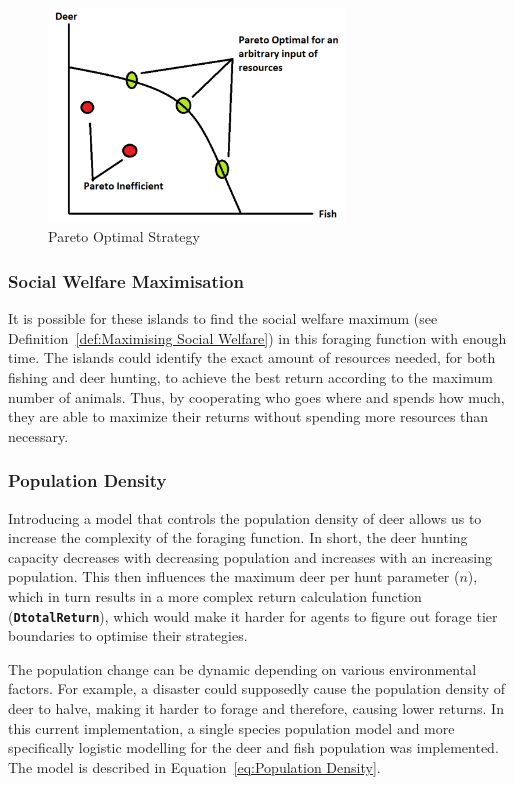 \begin{figure}[!htb]
    \centering
    \includegraphics[width=0.7\textwidth]{04_environment/images/Pareto Optimal Strategy.PNG}
    \caption{Pareto Optimal Strategy}
    \label{fig:Pareto Optimal Strategy}
\end{figure}

\subsubsection{Social Welfare Maximisation}

It is possible for these islands to find the social welfare maximum (see Definition~\ref{def:Maximising Social Welfare}) in this foraging function with enough time. The islands could identify the exact amount of resources needed, for both fishing and deer hunting, to achieve the best return according to the maximum number of animals. Thus, by cooperating who goes where and spends how much, they are able to maximize their returns without spending more resources than necessary.

\subsubsection{Population Density}

Introducing a model that controls the population density of deer allows us to increase the complexity of the foraging function. In short, the deer hunting capacity decreases with decreasing population and increases with an increasing population. This then influences the maximum deer per hunt parameter ($n$), which in turn results in a more complex return calculation function (\texttt{\textbf{DtotalReturn}}), which would make it harder for agents to figure out forage tier boundaries to optimise their strategies.

The population change can be dynamic depending on various environmental factors. For example, a disaster could supposedly cause the population density of deer to halve, making it harder to forage and therefore, causing lower returns. In this current implementation, a single species population model and more specifically logistic modelling for the deer and fish population was implemented. 
The model is described in Equation~\eqref{eq:Population Density}.

